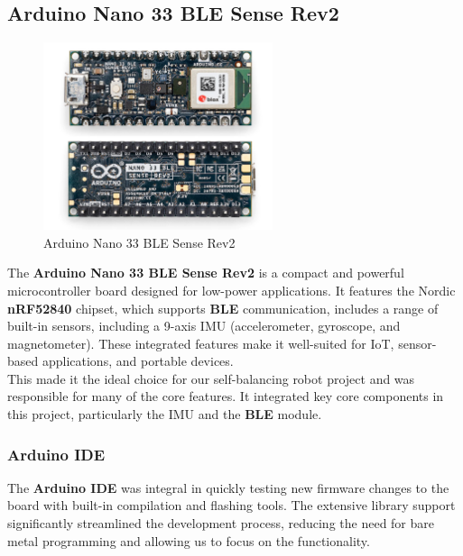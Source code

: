\documentclass{article}
\begin{document}
\subsection{Arduino Nano 33 BLE Sense Rev2}

\begin{figure}[H]
    \centering
    \includegraphics[width=0.6\textwidth]{Figures/arduino.jpg} %
    \caption{Arduino Nano 33 BLE Sense Rev2}
    \label{fig:arduino}
\end{figure}

\begin{minipage}{\linewidth}
    The \textbf{Arduino Nano 33 BLE Sense Rev2}  is a compact and powerful microcontroller board
    designed for low-power applications. It features the Nordic \textbf{nRF52840} chipset,
    which supports \textbf{BLE} communication, includes a range of built-in sensors,
    including a 9-axis IMU (accelerometer, gyroscope, and magnetometer).
    These integrated features make it well-suited for IoT, sensor-based applications, and portable devices. \\

    This made it the ideal choice for our self-balancing robot project and was responsible for many of the core features.
    It integrated key core components in this project, particularly the IMU and the \textbf{BLE} module. \\
\end{minipage}


\subsubsection{Arduino IDE}

\begin{minipage}{\linewidth}
    The \textbf{Arduino IDE} was integral in quickly testing new firmware changes to the board with built-in compilation and flashing tools.
    The extensive library support significantly streamlined the development process, reducing the need for bare metal programming and allowing us to focus on the functionality.
\end{minipage}
\end{document}
